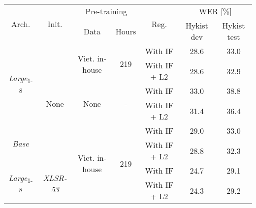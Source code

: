 

\begin{table}[!ht]
\captionsetup{font=Large}
\centering
\begin{adjustbox}{width=0.8\columnwidth,center}
\begin{tabular}{|c|c|c|c|c|c|c|} 
\hline
\multirow{2}{*}{Arch.}             & \multirow{2}{*}{Init.}            & \multicolumn{2}{c|}{Pre-training}                      & \multirow{2}{*}{Reg.} & \multicolumn{2}{c|}{WER [\%]}  \\ 
\cline{3-4}\cline{6-7}
                                   &                                   & Data                            & Hours                &                       & Hykist dev & Hykist test       \\ 
\hline
\multirow{4}{*}{\textit{Large}\textsubscript{1-8}} & \multirow{6}{*}{None}             & \multirow{2}{*}{Viet. in-house} & \multirow{2}{*}{219} & With IF               & 28.6       & 33.0              \\ 
\cline{5-7}
                                   &                                   &                                 &                      & With IF + L2          & 28.6       & 32.9              \\ 
\cline{3-7}
                                   &                                   & \multirow{2}{*}{None}           & \multirow{2}{*}{-}   & With IF               & 33.0       & 38.8              \\ 
\cline{5-7}
                                   &                                   &                                 &                      & With IF + L2          & 31.4       & 36.4              \\ 
\cline{1-1}\cline{3-7}
\multirow{2}{*}{\textit{Base}}     &                                   & \multirow{4}{*}{Viet. in-house} & \multirow{4}{*}{219} & With IF               & 29.0       & 33.0              \\ 
\cline{5-7}
                                   &                                   &                                 &                      & With IF + L2          & 28.8       & 32.3              \\ 
\cline{1-2}\cline{5-7}
\multirow{2}{*}{\textit{Large}\textsubscript{1-8}} & \multirow{2}{*}{\textit{XLSR-53}} &                                 &                      & With IF               & 24.7       & 29.1              \\ 
\cline{5-7}
                                   &                                   &                                 &                      & With IF + L2          & 24.3       & 29.2              \\
\hline
\end{tabular}
\end{adjustbox}
\caption{
    }
\label{table:L2_comb}
\end{table}